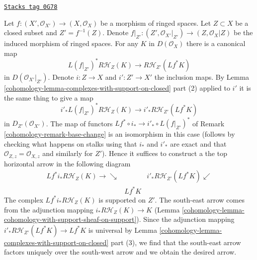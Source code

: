 \begin{remark}
\label{cohomology-remark-support-functorial}
\href{https://stacks.math.columbia.edu/tag/0G78}{\texttt{Stacks tag 0G78}}

Let $f : (X', \mathcal{O}_{X'}) \to (X, \mathcal{O}_X)$ be a morphism
of ringed spaces. Let $Z \subset X$ be a closed subset and $Z' = f^{-1}(Z)$.
Denote $f|_{Z'} : (Z', \mathcal{O}_{X'}|_{Z'}) \to (Z, \mathcal{O}_X|Z)$ be the
induced morphism of ringed spaces. For any $K$ in $D(\mathcal{O}_X)$ there
is a canonical map
$$
L(f|_{Z'})^*R\mathcal{H}_Z(K) \longrightarrow R\mathcal{H}_{Z'}(Lf^*K)
$$
in $D(\mathcal{O}_{X'}|_{Z'})$. Denote $i : Z \to X$ and $i' : Z' \to X'$
the inclusion maps. By
Lemma \ref{cohomology-lemma-complexes-with-support-on-closed} part (2)
applied to $i'$ it is the same thing to give a map
$$
i'_* L(f|_{Z'})^* R\mathcal{H}_Z(K)
\longrightarrow
i'_*R\mathcal{H}_{Z'}(Lf^*K)
$$
in $D_{Z'}(\mathcal{O}_{X'})$. The map of functors
$Lf^* \circ i_* \to i'_* \circ L(f|_{Z'})^*$ of
Remark \ref{cohomology-remark-base-change} is an isomorphism in this case
(follows by checking what happens on stalks using that $i_*$ and $i'_*$
are exact and that $\mathcal{O}_{Z, z} = \mathcal{O}_{X, z}$
and similarly for $Z'$). Hence it suffices to construct a the top
horizontal arrow in the following diagram
$$
\begin{array}{ccc}Lf^* i_* R\mathcal{H}_Z(K) \longrightarrow\searrow &  & i'_* R\mathcal{H}_{Z'}(Lf^*K) \swarrow \\  & Lf^*K & \end{array}
$$
The complex $Lf^* i_* R\mathcal{H}_Z(K)$ is supported on $Z'$. The south-east
arrow comes from the adjunction mapping $i_*R\mathcal{H}_Z(K) \to K$
(Lemma \ref{cohomology-lemma-cohomology-with-support-sheaf-on-support}). Since the
adjunction mapping $i'_* R\mathcal{H}_{Z'}(Lf^*K) \to Lf^*K$ is universal by
Lemma \ref{cohomology-lemma-complexes-with-support-on-closed} part (3), we find that
the south-east arrow factors uniquely over the south-west arrow and
we obtain the desired arrow.
\end{remark}

